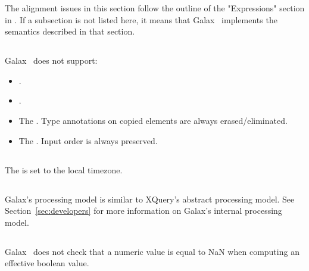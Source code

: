 The alignment issues in this section follow the outline of the
"Expressions" section in .  If a
subsection is not listed here, it means that Galax \version\ implements
the semantics described in that section.

\subsection*{}

   Galax \version\ does not support:
\begin{itemize}
\item {}.
\item {}.
\item The .  Type annotations on copied
  elements are always erased/eliminated. 
\item The .  Input order is always preserved. 
\end{itemize}

\subsection*{}
The  is set to the local timezone. 

\subsection*{}

Galax's processing model is similar to XQuery's abstract processing
model.  See Section~\ref{sec:developers} for more information on
Galax's internal processing model. 

\subsection*{}

\subsection*{}

   Galax \version\ does not check that a numeric value is equal to NaN
   when computing an effective boolean value.

